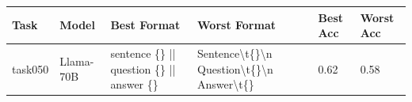 \begin{longtable}{@{}p{0.8cm\tiny}p{1cm\tiny}p{4.1cm\ttfamily\tiny}p{4.1cm\ttfamily\tiny}p{0.8cm\tiny}p{0.8cm\tiny}@{}}
\toprule
\footnotesize Task      & \footnotesize Model             & \rmfamily \footnotesize  Best Format                                                                                                                                                                                                                                                                                                                                                                                                                                                                                                               & \rmfamily \footnotesize 
 Worst Format                                                                                                                                                                                                                                             & \footnotesize Best Acc & \footnotesize Worst Acc                                                                                                                                                                                                                                                                                                                          \\ \midrule
task050   & Llama-70B  & sentence \{\} || question \{\} || answer \{\}                                                                                                                                                                                                                                                                                                                                                                                                                                                                           & Sentence\textbackslash{}t\{\}\textbackslash{}n Question\textbackslash{}t\{\}\textbackslash{}n Answer\textbackslash{}t\{\}                                                                                                                                                                                                                                                                                                                                                                                                                                                         & 0.62 & 0.58 \\

\end{longtable}

